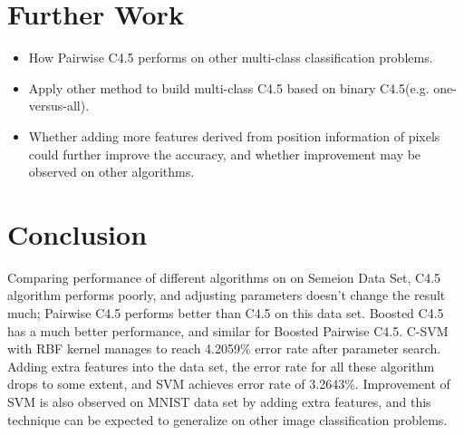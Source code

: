 \documentclass[a4paper,11pt]{article}
\begin{document}
\section{Further Work}
\begin{itemize}
 \item How Pairwise C4.5 performs on other multi-class classification problems.
 \item Apply other method to build multi-class C4.5 based on binary C4.5(e.g. one-versus-all).
 \item Whether adding more features derived from position information of pixels could further improve the accuracy, and whether improvement may be observed on other algorithms.
\end{itemize}
\section{Conclusion}
Comparing performance of different algorithms on on Semeion Data Set, C4.5 algorithm performs poorly, and adjusting parameters doesn't change the result much; Pairwise C4.5 performs better than C4.5 on this data set. Boosted C4.5 has a much better performance, and similar for Boosted Pairwise C4.5. C-SVM with RBF kernel manages to reach 4.2059\% error rate after parameter search. Adding extra features into the data set, the error rate for all these algorithm drops to some extent, and SVM achieves error rate of 3.2643\%. Improvement of SVM is also observed on MNIST data set by adding extra features, and this technique can be expected to generalize on other image classification problems.

\newpage


\end{document}
